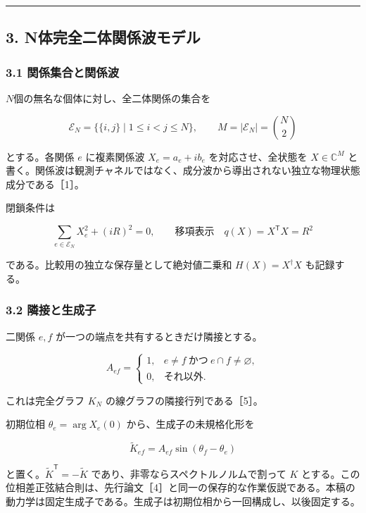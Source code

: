 \documentclass[
  a4paper,
]{ltjsarticle}
\begin{document}
\begin{center}\rule{0.5\linewidth}{0.5pt}\end{center}

\subsection{3.
N体完全二体関係波モデル}\label{nux4f53ux5b8cux5168ux4e8cux4f53ux95a2ux4fc2ux6ce2ux30e2ux30c7ux30eb}

\subsubsection{3.1
関係集合と関係波}\label{ux95a2ux4fc2ux96c6ux5408ux3068ux95a2ux4fc2ux6ce2}

\(N\)個の無名な個体に対し、全二体関係の集合を

\[
\mathcal E_N
=
\bigl\{\{i,j\}\mid 1\le i<j\le N\bigr\},
\qquad
M=\lvert\mathcal E_N\rvert=\binom{N}{2}
\]

とする。各関係 \(e\) に複素関係波 \(X_e=a_e+ib_e\) を対応させ、全状態を
\(X\in\mathbb C^M\)
と書く。関係波は観測チャネルではなく、成分波から導出されない独立な物理状態成分である［1］。

閉鎖条件は

\[
\sum_{e\in\mathcal E_N}X_e^2+(iR)^2=0,
\qquad
\text{移項表示}\quad
q(X)=X^{\mathsf T}X=R^2
\]

である。比較用の独立な保存量として絶対値二乗和 \(H(X)=X^\dagger X\)
も記録する。

\subsubsection{3.2
隣接と生成子}\label{ux96a3ux63a5ux3068ux751fux6210ux5b50}

二関係 \(e,f\) が一つの端点を共有するときだけ隣接とする。

\[
A_{ef}
=
\begin{cases}
1,& e\ne f\ \text{かつ}\ e\cap f\ne\varnothing,\\
0,& \text{それ以外}.
\end{cases}
\]

これは完全グラフ \(K_N\) の線グラフの隣接行列である［5］。

初期位相 \(\theta_e=\arg X_e(0)\) から、生成子の未規格化形を

\[
\widetilde K_{ef}
=
A_{ef}\sin(\theta_f-\theta_e)
\]

と置く。\(\widetilde K^{\mathsf T}=-\widetilde K\)
であり、非零ならスペクトルノルムで割って \(K\)
とする。この位相差正弦結合則は、先行論文［4］と同一の保存的な作業仮説である。本稿の動力学は固定生成子である。生成子は初期位相から一回構成し、以後固定する。
\end{document}
